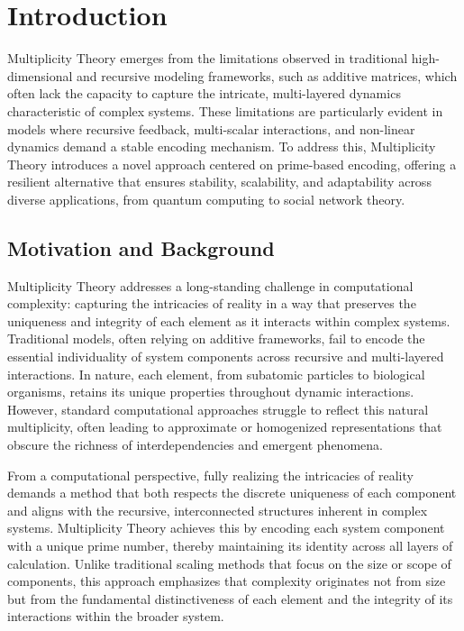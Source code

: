 \documentclass{article}
\theoremstyle{plain}
\begin{document}
\section{Introduction}
Multiplicity Theory emerges from the limitations observed in traditional high-dimensional and recursive modeling frameworks, such as additive matrices, which often lack the capacity to capture the intricate, multi-layered dynamics characteristic of complex systems. These limitations are particularly evident in models where recursive feedback, multi-scalar interactions, and non-linear dynamics demand a stable encoding mechanism. To address this, Multiplicity Theory introduces a novel approach centered on prime-based encoding, offering a resilient alternative that ensures stability, scalability, and adaptability across diverse applications, from quantum computing to social network theory.

\subsection{Motivation and Background}

Multiplicity Theory addresses a long-standing challenge in computational complexity: capturing the intricacies of reality in a way that preserves the uniqueness and integrity of each element as it interacts within complex systems. Traditional models, often relying on additive frameworks, fail to encode the essential individuality of system components across recursive and multi-layered interactions. In nature, each element, from subatomic particles to biological organisms, retains its unique properties throughout dynamic interactions. However, standard computational approaches struggle to reflect this natural multiplicity, often leading to approximate or homogenized representations that obscure the richness of interdependencies and emergent phenomena.

From a computational perspective, fully realizing the intricacies of reality demands a method that both respects the discrete uniqueness of each component and aligns with the recursive, interconnected structures inherent in complex systems. Multiplicity Theory achieves this by encoding each system component with a unique prime number, thereby maintaining its identity across all layers of calculation. Unlike traditional scaling methods that focus on the size or scope of components, this approach emphasizes that complexity originates not from size but from the fundamental distinctiveness of each element and the integrity of its interactions within the broader system.
\end{document}
